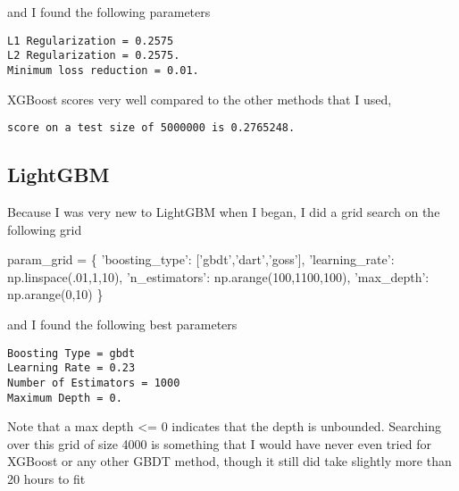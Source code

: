 \documentclass[11pt]{article}
\newenvironment{Shaded}{}{}
\newcommand{\DecValTok}[1]{\textcolor[rgb]{0.25,0.63,0.44}{{#1}}}
\newcommand{\StringTok}[1]{\textcolor[rgb]{0.25,0.44,0.63}{{#1}}}
\newcommand{\NormalTok}[1]{{#1}}
\newcommand{\OperatorTok}[1]{\textcolor[rgb]{0.40,0.40,0.40}{{#1}}}
\begin{document}
and I found the following parameters

    \begin{Verbatim}[commandchars=\\\{\}]
L1 Regularization = 0.2575
L2 Regularization = 0.2575.
Minimum loss reduction = 0.01.

    \end{Verbatim}

    XGBoost scores very well compared to the other methods that I used,

    \begin{Verbatim}[commandchars=\\\{\}]
score on a test size of 5000000 is 0.2765248.

    \end{Verbatim}

    \hypertarget{lightgbm}{%
\subsection{LightGBM}\label{lightgbm}}

Because I was very new to LightGBM when I began, I did a grid search on
the following grid

\begin{Shaded}
\begin{Highlighting}[]
\NormalTok{param_grid }\OperatorTok{=}\NormalTok{ \{}
    \StringTok{'boosting_type'}\NormalTok{: [}\StringTok{'gbdt'}\NormalTok{,}\StringTok{'dart'}\NormalTok{,}\StringTok{'goss'}\NormalTok{],}
    \StringTok{'learning_rate'}\NormalTok{: np.linspace(.}\DecValTok{01}\NormalTok{,}\DecValTok{1}\NormalTok{,}\DecValTok{10}\NormalTok{),}
    \StringTok{'n_estimators'}\NormalTok{: np.arange(}\DecValTok{100}\NormalTok{,}\DecValTok{1100}\NormalTok{,}\DecValTok{100}\NormalTok{),}
    \StringTok{'max_depth'}\NormalTok{: np.arange(}\DecValTok{0}\NormalTok{,}\DecValTok{10}\NormalTok{)}
\NormalTok{\}}
\end{Highlighting}
\end{Shaded}

and I found the following best parameters

    \begin{Verbatim}[commandchars=\\\{\}]
Boosting Type = gbdt
Learning Rate = 0.23
Number of Estimators = 1000
Maximum Depth = 0.

    \end{Verbatim}

    Note that a max depth \textless{}= 0 indicates that the depth is
unbounded. Searching over this grid of size 4000 is something that I
would have never even tried for XGBoost or any other GBDT method, though
it still did take slightly more than 20 hours to fit
\end{document}
